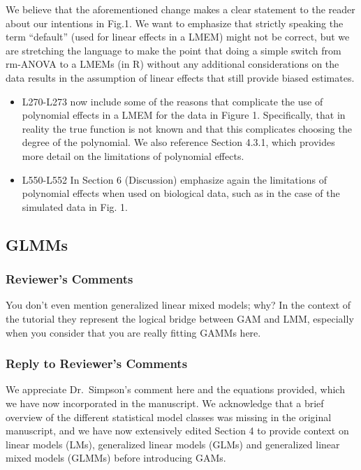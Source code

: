 \documentclass[
]{article}
\begin{document}
We believe that the aforementioned change makes a clear statement to the reader about our intentions in Fig.1. We want to emphasize that strictly speaking the term ``default'' (used for linear effects in a LMEM) might not be correct, but we are stretching the language to make the point that doing a simple switch from rm-ANOVA to a LMEMs (in R) without any additional considerations on the data results in the assumption of linear effects that still provide biased estimates.

\begin{itemize}
\item
  L270-L273 now include some of the reasons that complicate the use of polynomial effects in a LMEM for the data in Figure 1. Specifically, that in reality the true function is not known and that this complicates choosing the degree of the polynomial. We also reference Section 4.3.1, which provides more detail on the limitations of polynomial effects.
\item
  L550-L552 In Section 6 (Discussion) emphasize again the limitations of polynomial effects when used on biological data, such as in the case of the simulated data in Fig. 1.
\end{itemize}

\hypertarget{glmms}{%
\subsection{GLMMs}\label{glmms}}

\hypertarget{reviewers-comments-2}{%
\subsubsection{Reviewer's Comments}\label{reviewers-comments-2}}

You don't even mention generalized linear mixed models; why? In the context of the tutorial they represent the logical bridge between GAM and LMM, especially when you consider that you are really fitting GAMMs here.

\hypertarget{section-3}{%
\subsubsection{\texorpdfstring{\textcolor{reviewersblue} {Reply to Reviewer's Comments}}{}}\label{section-3}}

We appreciate Dr.~Simpson's comment here and the equations provided, which we have now incorporated in the manuscript. We acknowledge that a brief overview of the different statistical model classes was missing in the original manuscript, and we have now extensively edited Section 4 to provide context on linear models (LMs), generalized linear models (GLMs) and generalized linear mixed models (GLMMs) before introducing GAMs.
\end{document}
